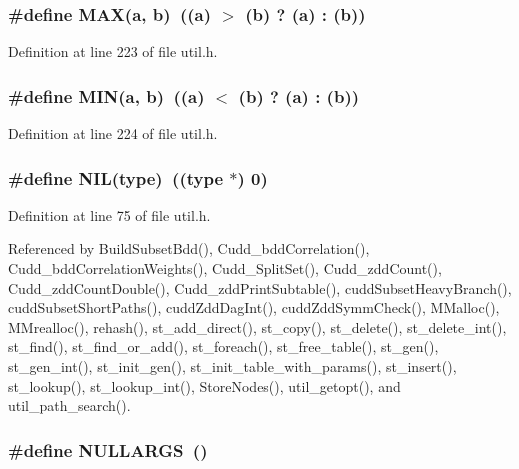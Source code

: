 \subsubsection{\setlength{\rightskip}{0pt plus 5cm}\#define MAX(a, b)~((a) $>$ (b) ? (a) : (b))}\label{util_8h_fa99ec4acc4ecb2dc3c2d05da15d0e3f}




Definition at line 223 of file util.h.
\subsubsection{\setlength{\rightskip}{0pt plus 5cm}\#define MIN(a, b)~((a) $<$ (b) ? (a) : (b))}\label{util_8h_3acffbd305ee72dcd4593c0d8af64a4f}




Definition at line 224 of file util.h.
\subsubsection{\setlength{\rightskip}{0pt plus 5cm}\#define NIL(type)~((type $\ast$) 0)}\label{util_8h_31bfee01545b78af63301bf9e857218b}




Definition at line 75 of file util.h.

Referenced by Build\-Subset\-Bdd(), Cudd\_\-bdd\-Correlation(), Cudd\_\-bdd\-Correlation\-Weights(), Cudd\_\-Split\-Set(), Cudd\_\-zdd\-Count(), Cudd\_\-zdd\-Count\-Double(), Cudd\_\-zdd\-Print\-Subtable(), cudd\-Subset\-Heavy\-Branch(), cudd\-Subset\-Short\-Paths(), cudd\-Zdd\-Dag\-Int(), cudd\-Zdd\-Symm\-Check(), MMalloc(), MMrealloc(), rehash(), st\_\-add\_\-direct(), st\_\-copy(), st\_\-delete(), st\_\-delete\_\-int(), st\_\-find(), st\_\-find\_\-or\_\-add(), st\_\-foreach(), st\_\-free\_\-table(), st\_\-gen(), st\_\-gen\_\-int(), st\_\-init\_\-gen(), st\_\-init\_\-table\_\-with\_\-params(), st\_\-insert(), st\_\-lookup(), st\_\-lookup\_\-int(), Store\-Nodes(), util\_\-getopt(), and util\_\-path\_\-search().
\subsubsection{\setlength{\rightskip}{0pt plus 5cm}\#define NULLARGS~()}\label{util_8h_e4304be66053e63a326c93f9b7f23067}




